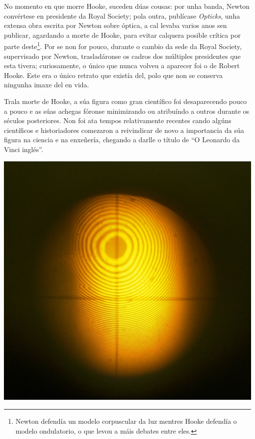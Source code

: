 \begin{refsection}
\begin{multicols}{2}
No momento en que morre Hooke, suceden dúas cousas: por unha banda, Newton
convértese en presidente da Royal Society; pola outra, publícase
\textit{Opticks}, unha extensa obra escrita por Newton sobre óptica, a cal
levaba varios anos sen publicar, agardando a morte de Hooke, para evitar
calquera posible crítica por parte deste\footnote{Newton defendía un modelo
corpuscular da luz mentres Hooke defendía o modelo ondulatorio, o que levou a
máis debates entre eles.}. Por se non for pouco, durante o cambio da sede da
Royal Society, supervisado por Newton, trasladáronse os cadros dos múltiples
presidentes que esta tivera; curiosamente, o único que nunca volveu a aparecer
foi o de Robert Hooke. Este era o único retrato que existía del, polo que non
se conserva ningunha imaxe del en vida.

Trala morte de Hooke, a súa figura como gran científico foi desaparecendo pouco
a pouco e as súas achegas fóronse minimizando ou atribuíndo a outros durante os
séculos posteriores. Non foi ata tempos relativamente recentes cando algúns
científicos e historiadores comezaron a reivindicar de novo a importancia da
súa figura na ciencia e na enxeñería, chegando a darlle o título de ``O
Leonardo da Vinci inglés''.

\begin{center}
    \includegraphics[scale=0.2]{revistas/002/imaxes/Newton-rings}
\end{center}

\nocite{gribbin2004historia}
\printbibliography

\end{multicols}
\end{refsection}
